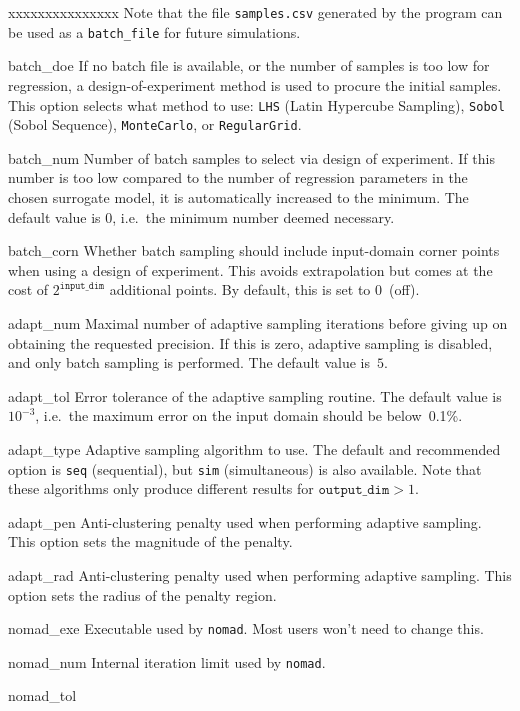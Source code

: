 \documentclass[a4paper,bibliography=numbered]{scrartcl}
\begin{document}
\begin{labeling}{xxxxxxxxxxxxxxx}
		Note that the file \texttt{samples.csv} generated by the program can be used as a \texttt{batch\_file} for future simulations.
	\item[batch\_doe]
		If no batch file is available, or the number of samples is too low for regression, a design-of-experiment method is used to procure the initial samples.
		This option selects what method to use: \texttt{LHS} (Latin Hypercube Sampling), \texttt{Sobol} (Sobol Sequence), \texttt{MonteCarlo}, or \texttt{RegularGrid}.
	\item[batch\_num]
		Number of batch samples to select via design of experiment.
		If this number is too low compared to the number of regression parameters in the chosen surrogate model, it is automatically increased to the minimum.
		The default value is 0, i.e.\ the minimum number deemed necessary.
	\item[batch\_corn]
		Whether batch sampling should include input-domain corner points when using a design of experiment. This avoids extrapolation but comes at the cost of $2^{\texttt{input\_dim}}$ additional points.
		By default, this is set to 0~(off).
	\item[adapt\_num]
		Maximal number of adaptive sampling iterations before giving up on obtaining the requested precision.
		If this is zero, adaptive sampling is disabled, and only batch sampling is performed.
		The default value is~$5$.
	\item[adapt\_tol]
		Error tolerance of the adaptive sampling routine.
		The default value is~$10^{-3}$, i.e.\ the maximum error on the input domain should be below~0.1\%.
	\item[adapt\_type]
		Adaptive sampling algorithm to use. 
		The default and recommended option is \texttt{seq} (sequential), but \texttt{sim} (simultaneous) is also available.
		Note that these algorithms only produce different results for $\texttt{output\_dim} > 1$.
	\item[adapt\_pen]
		Anti-clustering penalty used when performing adaptive sampling.
		This option sets the magnitude of the penalty.
	\item[adapt\_rad]
		Anti-clustering penalty used when performing adaptive sampling.
		This option sets the radius of the penalty region.
	\item[nomad\_exe]
		Executable used by \texttt{nomad}.
		Most users won't need to change this.
	\item[nomad\_num]
		Internal iteration limit used by \texttt{nomad}.
	\item[nomad\_tol]

\end{labeling}
\end{document}
